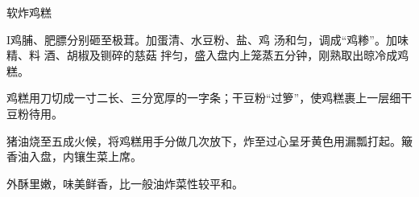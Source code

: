 \begin{recipe}{软炸鸡糕}

\ingredients



\preparation

I鸡脯、肥膘分别砸至极茸。加蛋清、水豆粉、盐、鸡 汤和匀，调成“鸡糁”。加味精、料
酒、胡椒及铡碎的慈菇 拌匀，盛入盘内上笼蒸五分钟，刚熟取出晾冷成鸡糕。

\step 鸡糕用刀切成一寸二长、三分宽厚的一字条；干豆粉“过箩”，使鸡糕裹上一层细干
豆粉待用。

\step 猪油烧至五成火候，将鸡糕用手分做几次放下，炸至过心呈牙黄色用漏瓢打起。簸
香油入盘，内镶生菜上席。

\features

外酥里嫩，味美鲜香，比一般油炸菜性较平和。

\end{recipe}

